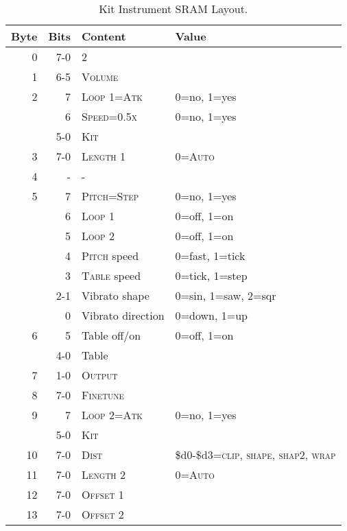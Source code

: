 \begin{table}
	\begin{center}
		\caption{Kit Instrument SRAM Layout.}
		\begin{tabular}{r|r|l|l}
			\toprule
   Byte & Bits	& Content 		& Value \\
   \midrule
      0	& 7-0 	& 2 			& \\
      1	& 6-5 	& \textsc{Volume} 	& \\
      2	& 7   	& \textsc{Loop 1=Atk} 	& 0=no, 1=yes \\
	& 6   	& \textsc{Speed=0.5x} 	& 0=no, 1=yes \\
	& 5-0 	& \textsc{Kit} 		& \\
      3	& 7-0 	& \textsc{Length 1} 	& 0=\textsc{Auto} \\
      4	& -   	& - 			& \\
      5	& 7   	& \textsc{Pitch=Step} 	& 0=no, 1=yes \\
	& 6   	& \textsc{Loop 1} 	& 0=off, 1=on \\
	& 5   	& \textsc{Loop 2} 	& 0=off, 1=on \\
	& 4   	& \textsc{Pitch} speed	& 0=fast, 1=tick \\
	& 3   	& \textsc{Table} speed	& 0=tick, 1=step \\
	& 2-1 	& Vibrato shape		& 0=sin, 1=saw, 2=sqr \\
	& 0   	& Vibrato direction	& 0=down, 1=up \\
      6	& 5   	& Table off/on		& 0=off, 1=on \\
	& 4-0 	& Table			& \\
      7	& 1-0 	& \textsc{Output}	& \\
      8	& 7-0 	& \textsc{Finetune}	& \\
      9	& 7   	& \textsc{Loop 2=Atk} 	& 0=no, 1=yes \\
	& 5-0 	& \textsc{Kit} 		& \\
     10	& 7-0 	& \textsc{Dist} 	& \$d0-\$d3=\textsc{clip, shape, shap2, wrap} \\
     11	& 7-0 	& \textsc{Length 2} 	& 0=\textsc{Auto} \\
     12	& 7-0 	& \textsc{Offset 1} 	& \\
     13	& 7-0 	& \textsc{Offset 2} 	& \\
   \bottomrule
		\end{tabular}
	\end{center}
\end{table}

